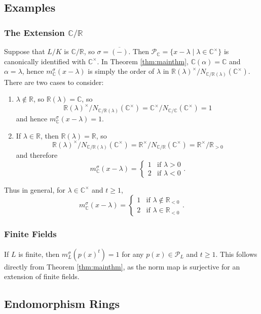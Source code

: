 \documentclass[10pt, reqno, hidelinks]{amsart}
\newcommand{\twopartdef}[4]
{
	\left\{
		\begin{array}{ll}
			#1 & \mbox{if } #2 \\
			#3 & \mbox{if } #4
		\end{array}
	\right.
}
\newcommand{\bC}{{\mathbb C}}
\newcommand{\bR}{{\mathbb R}}
\newcommand{\sP}{{\mathcal P}}
\numberwithin{thm}{subsection}
\theoremstyle{definition}
\begin{document}
\subsection{Examples}

\subsubsection{The Extension $\bC / \bR$}\label{eg:CoverR}

Suppose that $L / K$ is $\bC / \bR$, so $\sigma = \overline{(-)}$. Then $\sP_{\bC} = \{x - \lambda \mid \lambda \in \bC^{\times}\}$ is canonically identified with $\bC^{\times}$. In Theorem \ref{thm:mainthm}, $\bC(\alpha) = \bC$ and $\alpha = \lambda$, hence $m_{\bC}^{\sigma}(x - \lambda)$ is simply the order of $\lambda$ in $\bR(\lambda)^{\times} / N_{\bC / \bR(\lambda)}(\bC^{\times})$. There are two cases to consider:
\begin{enumerate}
		\item $\lambda \not\in \bR$, so $\bR(\lambda) = \bC$, so
		\[
		\bR(\lambda)^{\times} / N_{\bC / \bR(\lambda)}(\bC^{\times}) = \bC^{\times} / N_{\bC / \bC}(\bC^{\times}) = 1
		\]
		and hence $m_{\bC}^{\sigma}(x - \lambda) = 1$.
		\item If $\lambda \in \bR$, then $\bR(\lambda) = \bR$, so 
		\[
		\bR(\lambda)^{\times} / N_{\bC / \bR(\lambda)}(\bC^{\times}) = \bR^{\times} / N_{\bC / \bR}(\bC^{\times}) = \bR^{\times} / \bR_{> 0}
		\]
		and therefore
        \[
            m_{\bC}^{\sigma}(x - \lambda) = \twopartdef{1}{\lambda > 0}{2}{\lambda < 0}.
        \]
	\end{enumerate}
Thus in general, for $\lambda \in \bC^{\times}$ and $t \geq 1$,
        \[
        m_{\bC}^{\sigma}(x - \lambda) = \twopartdef{1}{\lambda \not\in \bR_{< 0}}{2}{\lambda \in \bR_{< 0}}.
        \]

\subsubsection{Finite Fields}

If $L$ is finite, then $m_L^{\sigma}(p(x)^t) = 1$ for any $p(x) \in \sP_L$ and $t \geq 1$. This follows directly from Theorem \ref{thm:mainthm}, as the norm map is surjective for an extension of finite fields.

\subsection{Endomorphism Rings}\label{sect:endomorphimrings}
\end{document}
